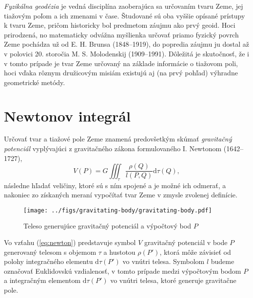 \documentclass[a4paper, 12pt]{book}
\newcommand{\diff}{\mathrm d}
\begin{document}
\emph{Fyzikálna geodézia} je vedná disciplína zaoberajúca sa určovaním tvaru 
Zeme, jej tiažovým poľom a ich zmenami v čase.  Študované sú oba vyššie opísané 
prístupy k tvaru Zeme, pričom historicky bol predmetom záujmu ako prvý geoid.  
Hoci prirodzená, no matematicky odvážna myšlienka určovať priamo fyzický povrch 
Zeme pochádza už od E. H. Brunsa (1848--1919), do popredia záujmu ju dostal až 
v polovici 20. storočia M. S. Molodenskij (1909--1991).  Dôležitá je 
skutočnosť, že i v tomto prípade je tvar Zeme určovaný na základe informácie 
o tiažovom poli, hoci vďaka rôznym družicovým misiám existujú aj (na prvý 
pohľad) výhradne geometrické metódy.

\section{Newtonov integrál}

Určovať tvar a tiažové pole Zeme znamená predovšetkým skúmať \emph{gravitačný 
potenciál} vyplývajúci z gravitačného zákona formulovaného I. Newtonom 
(1642--1727),
%
\begin{equation}
\label{eq:newton}
V(P) = G \iiint_{\tau} \frac{\rho(Q)}{l(P, Q)} \diff \tau(Q){,}
\end{equation}
%
následne hľadať veličiny, ktoré sú s ním spojené a je možné ich odmerať, 
a nakoniec zo získaných meraní vypočítať tvar Zeme v zmysle zvolenej definície.

\begin{figure}[bt]
\centering
\texttt{[image: ../figs/gravitating-body/gravitating-body.pdf]}
\caption{Teleso generujúce gravitačný potenciál a výpočtový bod $P$}
\end{figure}

Vo vzťahu (\ref{eq:newton}) predstavuje symbol $V$ gravitačný potenciál v bode 
$P$ generovaný telesom s objemom $\tau$ a hustotou $\rho(P')$, ktorá môže 
závisieť od polohy integračného elementu $\diff \tau(P')$ vo vnútri telesa.  
Symbolom $l$ budeme označovať Euklidovskú vzdialenosť, v tomto prípade medzi 
výpočtovým bodom $P$ a integračným elementom $\diff \tau(P')$ vo vnútri telesa, 
ktoré generuje gravitačne pole.
\end{document}
